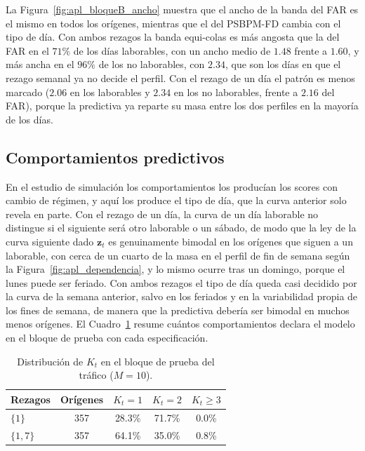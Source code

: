 La Figura~\ref{fig:apl_bloqueB_ancho} muestra que el ancho de la banda del FAR es el mismo en todos los orígenes, mientras que el del PSBPM-FD cambia con el tipo de día. Con ambos rezagos la banda equi-colas es más angosta que la del FAR en el $71\%$ de los días laborables, con un ancho medio de $1.48$ frente a $1.60$, y más ancha en el $96\%$ de los no laborables, con $2.34$, que son los días en que el rezago semanal ya no decide el perfil. Con el rezago de un día el patrón es menos marcado ($2.06$ en los laborables y $2.34$ en los no laborables, frente a $2.16$ del FAR), porque la predictiva ya reparte su masa entre los dos perfiles en la mayoría de los días.

\subsection{Comportamientos predictivos}
\label{04_03_03_comportamientos}

En el estudio de simulación los comportamientos los producían los scores con cambio de régimen, y aquí los produce el tipo de día, que la curva anterior solo revela en parte. Con el rezago de un día, la curva de un día laborable no distingue si el siguiente será otro laborable o un sábado, de modo que la ley de la curva siguiente dado $\mathbf{z}_t$ es genuinamente bimodal en los orígenes que siguen a un laborable, con cerca de un cuarto de la masa en el perfil de fin de semana según la Figura~\ref{fig:apl_dependencia}, y lo mismo ocurre tras un domingo, porque el lunes puede ser feriado. Con ambos rezagos el tipo de día queda casi decidido por la curva de la semana anterior, salvo en los feriados y en la variabilidad propia de los fines de semana, de manera que la predictiva debería ser bimodal en muchos menos orígenes. El Cuadro~\ref{tab:apl_K} resume cuántos comportamientos declara el modelo en el bloque de prueba con cada especificación.

\begin{table}[H]
\centering\small
\setlength{\tabcolsep}{3.5pt}
\caption{Distribución de $K_t$ en el bloque de prueba del tráfico ($M = 10$).}
\label{tab:apl_K}
\begin{tabular}{l c ccc}
\hline
Rezagos & Orígenes & $K_t = 1$ & $K_t = 2$ & $K_t \ge 3$ \\
\hline
$\{1\}$ & 357 & 28.3\% & 71.7\% & 0.0\% \\
$\{1,7\}$ & 357 & 64.1\% & 35.0\% & 0.8\% \\
\hline
\end{tabular}
\end{table}

